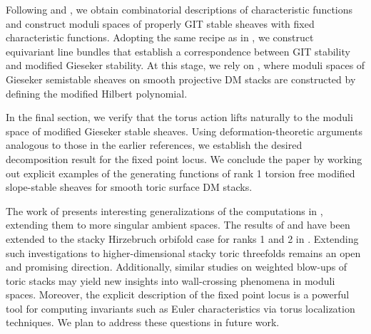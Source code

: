 \documentclass[10pt]{amsart}
\newcommand{\sO}{{\mathcal O}}
\newcommand{\rk}{\mathop{\rm rk}}
\numberwithin{equation}{subsection}
\begin{document}
Following \cite{Koo2} and \cite{WW}, we obtain combinatorial descriptions of characteristic functions and construct moduli spaces of properly GIT stable sheaves with fixed characteristic functions. Adopting the same recipe as in \cite{Dol}, we construct equivariant line bundles that establish a correspondence between GIT stability and modified Gieseker stability. At this stage, we rely on \cite{Nir}, where moduli spaces of Gieseker semistable sheaves on smooth projective DM stacks are constructed by defining the modified Hilbert polynomial.%

In the final section, we verify that the torus action lifts naturally to the moduli space of modified Gieseker stable sheaves. Using deformation-theoretic arguments analogous to those in the earlier references, we establish the desired decomposition result for the fixed point locus. We conclude the paper by working out explicit examples of the generating functions of rank 1 torsion free modified slope-stable sheaves for smooth toric surface DM stacks.

The work of \cite{GJK} presents interesting generalizations of the computations in \cite{Koo3}, extending them to more singular ambient spaces. The results of \cite{Got} and \cite{LGot} have been extended to the stacky Hirzebruch orbifold case for ranks 1 and 2 in \cite{WW}. Extending such investigations to higher-dimensional stacky toric threefolds remains an open and promising direction. Additionally, similar studies on weighted blow-ups of toric stacks may yield new insights into wall-crossing phenomena in moduli spaces. Moreover, the explicit description of the fixed point locus is a powerful tool for computing invariants such as Euler characteristics via torus localization techniques. We plan to address these questions in future work.

\end{document}

